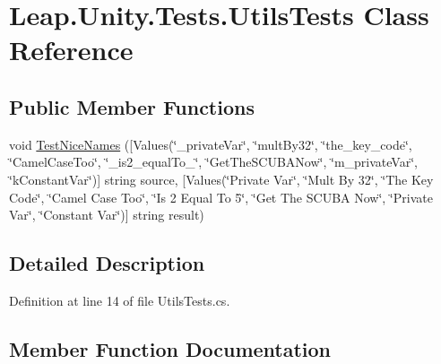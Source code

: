 \hypertarget{class_leap_1_1_unity_1_1_tests_1_1_utils_tests}{}\section{Leap.\+Unity.\+Tests.\+Utils\+Tests Class Reference}
\label{class_leap_1_1_unity_1_1_tests_1_1_utils_tests}
\subsection*{Public Member Functions}
\begin{DoxyCompactItemize}
\item 
void \mbox{\hyperlink{class_leap_1_1_unity_1_1_tests_1_1_utils_tests_a777932fad30ee388f5baa7b0c14b8359}{Test\+Nice\+Names}} (\mbox{[}Values(\char`\"{}\+\_\+private\+Var\char`\"{}, \char`\"{}mult\+By32\char`\"{}, \char`\"{}the\+\_\+key\+\_\+code\char`\"{}, \char`\"{}Camel\+Case\+Too\char`\"{}, \char`\"{}\+\_\+is2\+\_\+equal\+To\+\_\char`\"{}, \char`\"{}Get\+The\+S\+C\+U\+B\+A\+Now\char`\"{}, \char`\"{}m\+\_\+private\+Var\char`\"{}, \char`\"{}k\+Constant\+Var\char`\"{})\mbox{]} string source, \mbox{[}Values(\char`\"{}Private Var\char`\"{}, \char`\"{}Mult By 32\char`\"{}, \char`\"{}The Key Code\char`\"{}, \char`\"{}Camel Case Too\char`\"{}, \char`\"{}Is 2 Equal To 5\char`\"{}, \char`\"{}Get The S\+C\+U\+BA Now\char`\"{}, \char`\"{}Private Var\char`\"{}, \char`\"{}Constant Var\char`\"{})\mbox{]} string result)
\end{DoxyCompactItemize}


\subsection{Detailed Description}


Definition at line 14 of file Utils\+Tests.\+cs.



\subsection{Member Function Documentation}
\mbox{\label{class_leap_1_1_unity_1_1_tests_1_1_utils_tests_a777932fad30ee388f5baa7b0c14b8359}} 
